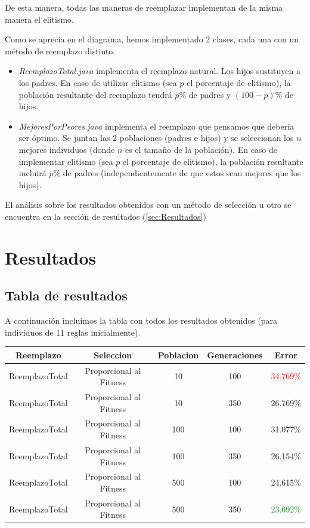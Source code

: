 \documentclass[nochap]{apuntes}
\begin{document}
De esta manera, todas las maneras de reemplazar implementan de la misma manera el elitismo.

Como se aprecia en el diagrama, hemos implementado 2 clases, cada una con un método de reemplazo distinto.
\label{est:MejoresPorPeores}

\begin{itemize}
	\item \textit{ReemplazoTotal.java} implementa el reemplazo natural. Los hijos sustituyen a los padres. En caso de utilizar elitismo (sea $p$ el porcentaje de elitismo), la población resultante del reemplazo tendrá $p\%$ de padres y $(100-p)\%$ de hijos.
	\item \textit{MejoresPorPeores.java} implementa el reemplazo que pensamos que debería ser óptimo. Se juntan las 2 poblaciones (padres e hijos) y se seleccionan los $n$ mejores individuos (donde $n$ es el tamaño de la población). 
	\subitem En caso de implementar elitismo (sea $p$ el porcentaje de elitismo), la población resultante incluirá $p\%$ de padres (independientemente de que estos sean mejores que los hijos).
\end{itemize}

El análisis sobre los resultados obtenidos con un método de selección u otro se encuentra en la sección de resultados (\ref{sec:Resultados}) 


\chapter{Resultados}
\section{Tabla de resultados}

A continuación incluimos la tabla con todos los resultados obtenidos (para individuos de 11 reglas inicialmente).

\begin{center}
\begin{tabular}{cccc|c}
Reemplazo & Seleccion & Poblacion & Generaciones & Error\\\hline
ReemplazoTotal & Proporcional al Fitness & 10 & 100 & \textcolor{red}{34.769\%} \\
ReemplazoTotal & Proporcional al Fitness & 10 & 350 & 26.769\% \\
ReemplazoTotal & Proporcional al Fitness & 100 & 100 & 31.077\% \\
ReemplazoTotal & Proporcional al Fitness & 100 & 350 & 26.154\% \\
ReemplazoTotal & Proporcional al Fitness & 500 & 100 & 24.615\% \\
ReemplazoTotal & Proporcional al Fitness & 500 & 350 & \textcolor{green}{23.692\%} 
\label{tablaProfundos}
\end{tabular}
\end{center}
\end{document}
